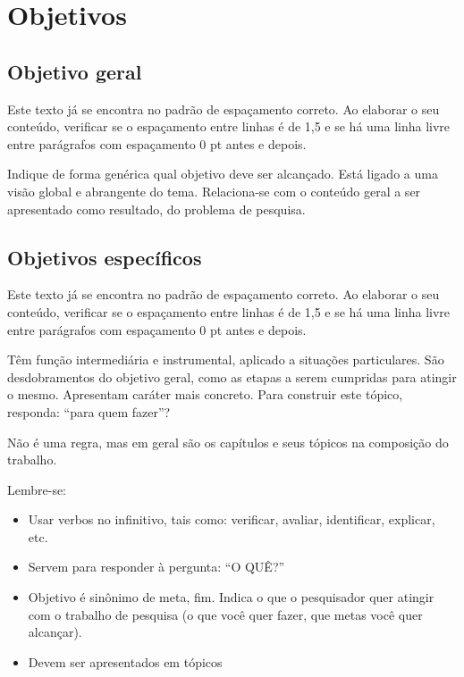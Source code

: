 \section{Objetivos}
\subsection{Objetivo geral}

Este texto já se encontra no padrão de espaçamento correto. Ao elaborar o seu conteúdo, verificar se o espaçamento entre linhas é de 1,5 e se há uma linha livre entre parágrafos com espaçamento 0 pt antes e depois. 

Indique de forma genérica qual objetivo deve ser alcançado. Está ligado a uma visão global e abrangente do tema. Relaciona-se com o conteúdo geral a ser apresentado como resultado, do problema de pesquisa.   

\subsection{Objetivos específicos}

Este texto já se encontra no padrão de espaçamento correto. Ao elaborar o seu conteúdo, verificar se o espaçamento entre linhas é de 1,5 e se há uma linha livre entre parágrafos com espaçamento 0 pt antes e depois. 

Têm função intermediária e instrumental, aplicado a situações particulares. São desdobramentos do objetivo geral, como as etapas a serem cumpridas para atingir o mesmo. Apresentam caráter mais concreto. Para construir este tópico, responda: “para quem fazer”? 

Não é uma regra, mas em geral são os capítulos e seus tópicos na composição do trabalho. 

Lembre-se:  
\begin{itemize}

 \item Usar verbos no infinitivo, tais como: verificar, avaliar, identificar, explicar, etc. 

 \item Servem para responder à pergunta: “O QUÊ?” 

 \item Objetivo é sinônimo de meta, fim. Indica o que o pesquisador quer atingir com o trabalho de pesquisa (o que você quer fazer, que metas você quer alcançar).  

 \item Devem ser apresentados em tópicos 
\end{itemize}

\cite{OpenVLC}
